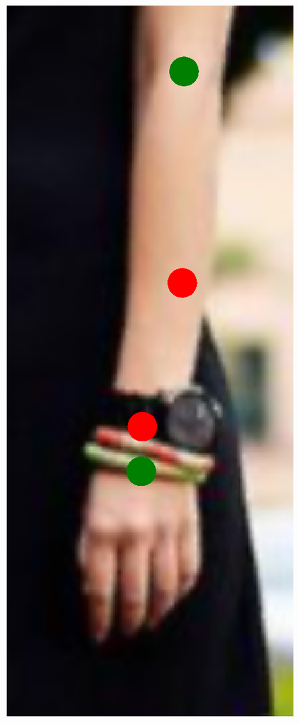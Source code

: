 \begin{figure}[!t]
    \includegraphics[height=\fh]{resources/Fixing/fix_2}
    \hfill

\end{figure}
